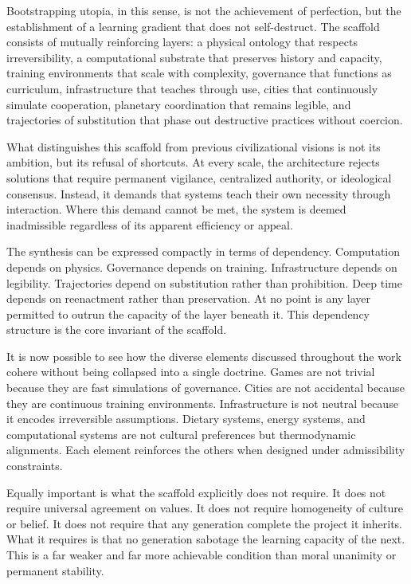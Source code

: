 \documentclass[12pt,oneside]{book}
\begin{document}
Bootstrapping utopia, in this sense, is not the achievement of perfection, but the establishment of a learning gradient that does not self-destruct. The scaffold consists of mutually reinforcing layers: a physical ontology that respects irreversibility, a computational substrate that preserves history and capacity, training environments that scale with complexity, governance that functions as curriculum, infrastructure that teaches through use, cities that continuously simulate cooperation, planetary coordination that remains legible, and trajectories of substitution that phase out destructive practices without coercion.

What distinguishes this scaffold from previous civilizational visions is not its ambition, but its refusal of shortcuts. At every scale, the architecture rejects solutions that require permanent vigilance, centralized authority, or ideological consensus. Instead, it demands that systems teach their own necessity through interaction. Where this demand cannot be met, the system is deemed inadmissible regardless of its apparent efficiency or appeal.

The synthesis can be expressed compactly in terms of dependency. Computation depends on physics. Governance depends on training. Infrastructure depends on legibility. Trajectories depend on substitution rather than prohibition. Deep time depends on reenactment rather than preservation. At no point is any layer permitted to outrun the capacity of the layer beneath it. This dependency structure is the core invariant of the scaffold.

It is now possible to see how the diverse elements discussed throughout the work cohere without being collapsed into a single doctrine. Games are not trivial because they are fast simulations of governance. Cities are not accidental because they are continuous training environments. Infrastructure is not neutral because it encodes irreversible assumptions. Dietary systems, energy systems, and computational systems are not cultural preferences but thermodynamic alignments. Each element reinforces the others when designed under admissibility constraints.

Equally important is what the scaffold explicitly does not require. It does not require universal agreement on values. It does not require homogeneity of culture or belief. It does not require that any generation complete the project it inherits. What it requires is that no generation sabotage the learning capacity of the next. This is a far weaker and far more achievable condition than moral unanimity or permanent stability.
\end{document}
